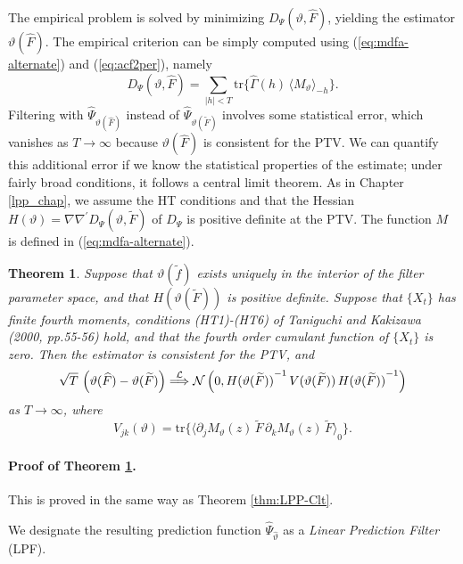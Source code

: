 \documentclass[a4paper]{book}
\def\convinlaw{\stackrel{{\cal L}}{\Longrightarrow }}
\def\tends{\rightarrow}
\newtheorem{Theorem}{Theorem}
\begin{document}
  The empirical problem is solved by minimizing $D_{\Psi} (\vartheta, \widehat{F})$,
 yielding the estimator $\vartheta (\widehat{F})$.  The empirical criterion can be simply 
 computed using (\ref{eq:mdfa-alternate}) and (\ref{eq:acf2per}), namely
\[
   D_{\Psi} (\vartheta, \widehat{F}) = \sum_{|h| < T } \mbox{tr} \{ 
   \widehat{\Gamma} (h) \,  { \langle  M_{\vartheta} \rangle }_{-h} \}.
\] 
Filtering with  $\widehat{\Psi}_{\vartheta (\widehat{F})}$ instead
 of $\widehat{\Psi}_{\vartheta (\widetilde{F})}$
 involves some statistical error, which vanishes as $T \tends \infty$ because
  $\vartheta (  \widehat{F})$ is consistent for the PTV.  We can quantify this additional 
 error if we know the statistical properties of the estimate; under fairly broad conditions,
 it follows a central limit theorem.  As in Chapter \ref{lpp_chap}, we assume 
  the HT conditions and that   the  Hessian  $H(\vartheta) = \nabla \nabla^{\prime}
  D_{\Psi} (\vartheta, \widetilde{F}) $  of $D_{\Psi} $ is positive definite at the PTV.
  The function $M$ is defined in (\ref{eq:mdfa-alternate}).

\begin{Theorem} 
\label{thm:MDFAasymp}
 Suppose that $\vartheta (\widetilde{f})$ exists uniquely in the
 interior of the filter parameter space, and that
 $H(\vartheta (\widetilde{F}))$ is 
 positive definite.  Suppose that $\{ X_t \}$ has finite fourth moments, 
conditions (HT1)-(HT6) of Taniguchi and Kakizawa (2000, pp.55-56)
 hold, and that the fourth order cumulant function of $\{ X_t \}$ is zero.  
 Then the estimator is consistent for the PTV, and
\[
 \sqrt{T} \, \left( \vartheta( \widehat{F} ) - \vartheta (\widetilde{F}) \right) 
 \convinlaw \mathcal{N} \left( 0, { H(\vartheta (\widetilde{F})) }^{-1} \, 
 V (\vartheta (\widetilde{F})) \, { H(\vartheta (\widetilde{F})) }^{-1} \right)
\]
 as $T \tends \infty$, where 
\[
  V_{jk} (\vartheta) =  \mbox{tr} \{ { \langle  \partial_j M_{\vartheta} (z) \, \widetilde{F} \,
 \partial_k M_{\vartheta} (z) \, \widetilde{F} \rangle }_0 \}.
\]
\end{Theorem}

\paragraph{Proof of Theorem \ref{thm:MDFAasymp}.}
  This is proved in the same way as Theorem \ref{thm:LPP-Clt}.

\vspace{.5cm}

  We designate the resulting   prediction function
$\widehat{\Psi}_{\widehat{\vartheta}}$  as  a {\em Linear
Prediction Filter} (LPF). 
\end{document}
